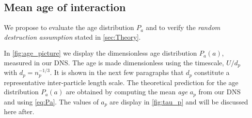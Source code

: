 
\subsection{Mean age of interaction}

We propose to evaluate the age distribution $P_a$ and to verify the \textit{random destruction assumption} stated in \ref{sec:Theory}. 

In \ref{fig:age_picture} we display the dimensionless age distribution $P_a(a)$, measured in our DNS. 
The age is made dimensionless using the timescale, $U/d_p$ with $d_p = n_p^{-1/3}$.
It is shown in the next few paragraphs that $d_p$ constitute a representative inter-particle length scale. 
The theoretical prediction for the age distribution $P_a(a)$ are obtained by computing the mean \textit{age} $a_p$ from our DNS and using \ref{eq:Pa}. 
The values of $a_p$ are display in \ref{fig:tau_p} and will be discussed here after. 

